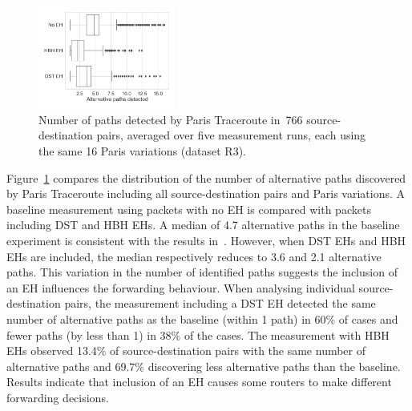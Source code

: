 \documentclass[conference]{IEEEtran}
\begin{document}


\begin{figure}[t]
\centering
  \includegraphics[width=0.4\textwidth]{altpaths.png}
  \caption{Number of paths detected by Paris Traceroute in~766
source-destination pairs, averaged over five measurement runs, each using
the same 16 Paris variations (dataset R3).}
  \label{fig:paths-detected}
\end{figure}



Figure~\ref{fig:paths-detected} compares the distribution of the number of
alternative paths discovered by Paris Traceroute including all
source-destination pairs and Paris variations.  A baseline measurement using packets with no EH
is compared with packets including DST and HBH EHs.  
A median of 4.7 alternative paths in the baseline experiment is consistent with the
results in~\cite{augustin2006avoiding}.  However, when DST EHs and HBH EHs are
included, the median respectively reduces to 3.6 and 2.1 alternative paths.  
This variation in the number of identified paths suggests the inclusion of
an EH influences the forwarding behaviour.  
When analysing individual source-destination pairs, the
measurement including a DST EH detected the same number of alternative paths as the baseline
(within 1 path) in 60\% of cases and fewer paths (by less than 1) in 38\% of
the cases.  The measurement with HBH EHs observed 13.4\%
of source-destination pairs with the same number of alternative paths and
69.7\% discovering less alternative paths than the baseline.
Results indicate that inclusion of an EH causes some routers to make
different forwarding decisions.
\end{document}
